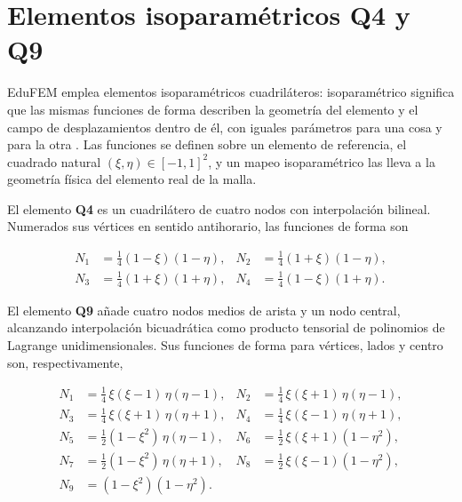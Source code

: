 \section{Elementos isoparamétricos Q4 y Q9}
\label{sec:isoparametricos}

EduFEM emplea elementos isoparamétricos cuadriláteros: isoparamétrico significa que las mismas funciones de forma describen la geometría del elemento y el campo de desplazamientos dentro de él, con iguales parámetros para una cosa y para la otra \autocites[p.~339]{bathe2014fem}[p.~187]{onate2009structural}. Las funciones se definen sobre un elemento de referencia, el cuadrado natural $(\xi, \eta) \in [-1, 1]^2$, y un mapeo isoparamétrico las lleva a la geometría física del elemento real de la malla.

El elemento \textbf{Q4} es un cuadrilátero de cuatro nodos con interpolación bilineal. Numerados sus vértices en sentido antihorario, las funciones de forma son

\begin{equation}
\begin{aligned}
N_1 &= \tfrac{1}{4}(1-\xi)(1-\eta), & N_2 &= \tfrac{1}{4}(1+\xi)(1-\eta), \\
N_3 &= \tfrac{1}{4}(1+\xi)(1+\eta), & N_4 &= \tfrac{1}{4}(1-\xi)(1+\eta).
\end{aligned}
\label{eq:N-q4}
\end{equation}

El elemento \textbf{Q9} añade cuatro nodos medios de arista y un nodo central, alcanzando interpolación bicuadrática como producto tensorial de polinomios de Lagrange unidimensionales. Sus funciones de forma para vértices, lados y centro son, respectivamente,

\begin{equation}
\begin{aligned}
N_1 &= \tfrac{1}{4}\,\xi(\xi-1)\,\eta(\eta-1), & N_2 &= \tfrac{1}{4}\,\xi(\xi+1)\,\eta(\eta-1), \\
N_3 &= \tfrac{1}{4}\,\xi(\xi+1)\,\eta(\eta+1), & N_4 &= \tfrac{1}{4}\,\xi(\xi-1)\,\eta(\eta+1), \\
N_5 &= \tfrac{1}{2}(1-\xi^2)\,\eta(\eta-1), & N_6 &= \tfrac{1}{2}\,\xi(\xi+1)(1-\eta^2), \\
N_7 &= \tfrac{1}{2}(1-\xi^2)\,\eta(\eta+1), & N_8 &= \tfrac{1}{2}\,\xi(\xi-1)(1-\eta^2), \\
N_9 &= (1-\xi^2)(1-\eta^2). &&
\end{aligned}
\label{eq:N-q9}
\end{equation}

